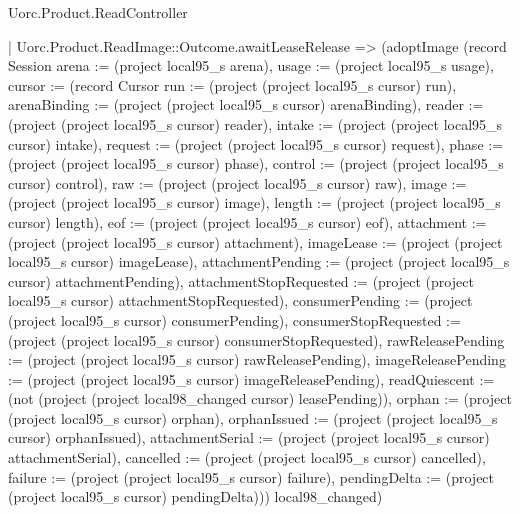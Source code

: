 \begin{lexlean}{Uorc.Product.ReadController}
\begin{semanticmodule}
{      | Uorc.Product.ReadImage::Outcome.awaitLeaseRelease => (adoptImage (record Session {arena := (project local95_s arena), usage := (project local95_s usage), cursor := (record Cursor {run := (project (project local95_s cursor) run), arenaBinding := (project (project local95_s cursor) arenaBinding), reader := (project (project local95_s cursor) reader), intake := (project (project local95_s cursor) intake), request := (project (project local95_s cursor) request), phase := (project (project local95_s cursor) phase), control := (project (project local95_s cursor) control), raw := (project (project local95_s cursor) raw), image := (project (project local95_s cursor) image), length := (project (project local95_s cursor) length), eof := (project (project local95_s cursor) eof), attachment := (project (project local95_s cursor) attachment), imageLease := (project (project local95_s cursor) imageLease), attachmentPending := (project (project local95_s cursor) attachmentPending), attachmentStopRequested := (project (project local95_s cursor) attachmentStopRequested), consumerPending := (project (project local95_s cursor) consumerPending), consumerStopRequested := (project (project local95_s cursor) consumerStopRequested), rawReleasePending := (project (project local95_s cursor) rawReleasePending), imageReleasePending := (project (project local95_s cursor) imageReleasePending), readQuiescent := (not (project (project local98_changed cursor) leasePending)), orphan := (project (project local95_s cursor) orphan), orphanIssued := (project (project local95_s cursor) orphanIssued), attachmentSerial := (project (project local95_s cursor) attachmentSerial), cancelled := (project (project local95_s cursor) cancelled), failure := (project (project local95_s cursor) failure), pendingDelta := (project (project local95_s cursor) pendingDelta)})}) local98_changed)
}
\end{semanticmodule}
\end{lexlean}
